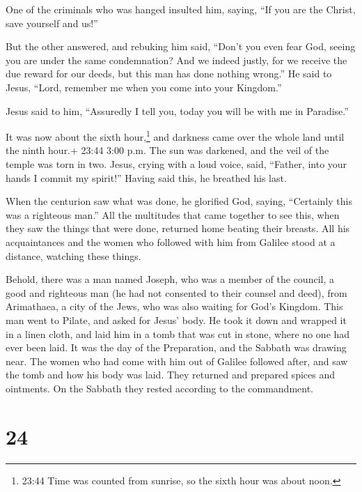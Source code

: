  One of the criminals who was hanged insulted him, saying,
``If you are the Christ, save yourself and us!''

 But the other answered, and rebuking him said, ``Don't you
even fear God, seeing you are under the same condemnation? 
And we indeed justly, for we receive the due reward for our deeds, but
this man has done nothing wrong.''  He said to Jesus,
``Lord, remember me when you come into your Kingdom.''

 Jesus said to him, ``Assuredly I tell you, today you will
be with me in Paradise.''

 It was now about the sixth hour,\footnote{23:44 Time was
  counted from sunrise, so the sixth hour was about noon.} and darkness
came over the whole land until the ninth hour.+ 23:44 3:00 p.m.
 The sun was darkened, and the veil of the temple was torn
in two.  Jesus, crying with a loud voice, said, ``Father,
into your hands I commit my spirit!'' Having said this, he breathed his
last.

 When the centurion saw what was done, he glorified God,
saying, ``Certainly this was a righteous man.''  All the
multitudes that came together to see this, when they saw the things that
were done, returned home beating their breasts.  All his
acquaintances and the women who followed with him from Galilee stood at
a distance, watching these things.

 Behold, there was a man named Joseph, who was a member of
the council, a good and righteous man  (he had not
consented to their counsel and deed), from Arimathaea, a city of the
Jews, who was also waiting for God's Kingdom.  This man
went to Pilate, and asked for Jesus' body.  He took it down
and wrapped it in a linen cloth, and laid him in a tomb that was cut in
stone, where no one had ever been laid.  It was the day of
the Preparation, and the Sabbath was drawing near.  The
women who had come with him out of Galilee followed after, and saw the
tomb and how his body was laid.  They returned and prepared
spices and ointments. On the Sabbath they rested according to the
commandment.

\hypertarget{section-14}{%
\section{24}\label{section-14}}

